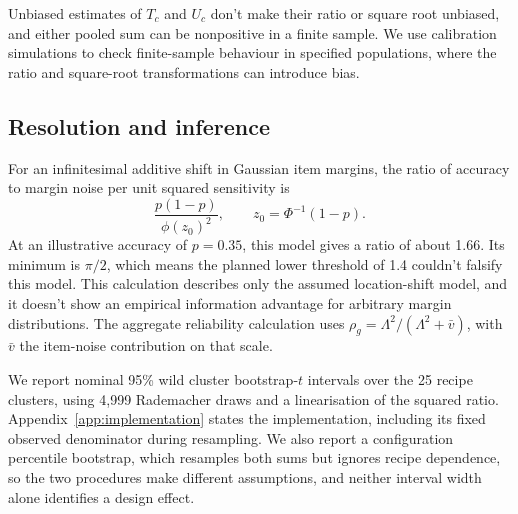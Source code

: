 \documentclass{article}
\newcommand{\Lam}{\Lambda}
\begin{document}
Unbiased estimates of $T_c$ and $U_c$ don't make their ratio or square root unbiased, and either pooled sum can be nonpositive in a finite sample. We use calibration simulations to check finite-sample behaviour in specified populations, where the ratio and square-root transformations can introduce bias.

\subsection{Resolution and inference}
For an infinitesimal additive shift in Gaussian item margins, the ratio of accuracy to margin noise per unit squared sensitivity is
\begin{equation}
\frac{p(1-p)}{\phi(z_0)^2},\qquad z_0=\Phi^{-1}(1-p).
\label{eq:information}
\end{equation}
At an illustrative accuracy of $p=0.35$, this model gives a ratio of about 1.66. Its minimum is $\pi/2$, which means the planned lower threshold of 1.4 couldn't falsify this model. This calculation describes only the assumed location-shift model, and it doesn't show an empirical information advantage for arbitrary margin distributions. The aggregate reliability calculation uses $\rho_g=\Lam^2/(\Lam^2+\bar v)$, with $\bar v$ the item-noise contribution on that scale.

We report nominal 95\% wild cluster bootstrap-$t$ intervals over the 25 recipe clusters, using 4,999 Rademacher draws and a linearisation of the squared ratio. Appendix~\ref{app:implementation} states the implementation, including its fixed observed denominator during resampling. We also report a configuration percentile bootstrap, which resamples both sums but ignores recipe dependence, so the two procedures make different assumptions, and neither interval width alone identifies a design effect.
\end{document}

